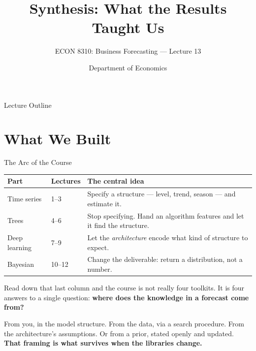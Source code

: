 \documentclass[aspectratio=169, 11pt]{beamer}
\title[Synthesis]{Synthesis: What the Results Taught Us}
\subtitle{ECON 8310: Business Forecasting --- Lecture 13}
\author{Department of Economics}
\institute{University of Nebraska at Omaha}
\begin{document}

\begin{frame}
  \titlepage
\end{frame}

\begin{frame}{Lecture Outline}
  \tableofcontents
\end{frame}

\section{What We Built}


\begin{frame}{The Arc of the Course}
  \begin{center}
    {\small
    \begin{tabular}{p{2.3cm}p{3.0cm}p{7.0cm}}
      \toprule
      \textbf{Part} & \textbf{Lectures} & \textbf{The central idea} \\
      \midrule
      Time series & 1--3 & Specify a structure --- level, trend, season --- and estimate it. \\[3pt]
      Trees & 4--6 & Stop specifying. Hand an algorithm features and let it find the structure. \\[3pt]
      Deep learning & 7--9 & Let the \emph{architecture} encode what kind of structure to expect. \\[3pt]
      Bayesian & 10--12 & Change the deliverable: return a distribution, not a number. \\
      \bottomrule
    \end{tabular}
    }
  \end{center}

  \vspace{0.1cm}
  Read down that last column and the course is not really four toolkits. It is four answers to a
  single question: \textbf{where does the knowledge in a forecast come from?}

  \vspace{0.1cm}
  From you, in the model structure. From the data, via a search procedure. From the
  architecture's assumptions. Or from a prior, stated openly and updated. \textbf{That framing is
  what survives when the libraries change.}
\end{frame}
\end{document}
